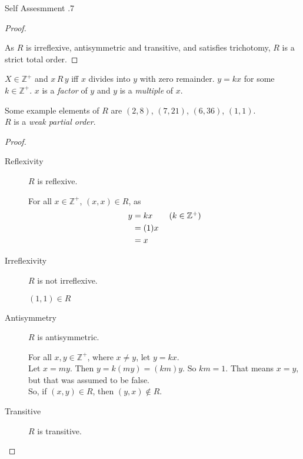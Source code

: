 \documentclass[\main/notes.tex]{subfiles}
\begin{document}
\begin{exercise}{Self Assesmment \thechapter.7}
\begin{questions}
\begin{answer}
\begin{proof}
\begin{description}
\begin{subproof}
											\end{subproof}
									\end{description}
									As $R$ is irreflexive, antisymmetric and transitive, and satisfies trichotomy, $R$ is a strict total order.
								\end{proof}
							\end{answer}
						\pagebreak
						\item $X \in \mathbb{Z}^{+}$ and $x \, R \, y$ iff $x$ divides into $y$ with zero remainder. $y = kx$ for some $k \in \mathbb{Z}^{+}$. $x$ is a \emph{factor} of $y$ and $y$ is a \emph{multiple} of $x$.\\
							\begin{answer}
								Some example elements of $R$ are $(2, 8)$, $(7, 21)$, $(6, 36)$, $(1, 1)$.\\
								$R$ is a \emph{weak partial order}.
								\begin{proof}
									$ $
									\begin{description}
										\item[Reflexivity] $R$ is reflexive.
											\begin{subproof}
												For all $x \in \mathbb{Z}^{+}$, $(x, x) \in R$, as
												\begin{align*}
													y &= kx \tag*{$(k \in \mathbb{Z}^{+})$}\\
													&= (1)x\\
													&= x
												\end{align*}
											\end{subproof}
										\item[Irreflexivity] $R$ is not irreflexive.
											\begin{subproof}[Counterexample]
												$(1, 1) \in R$
											\end{subproof}
										\item[Antisymmetry] $R$ is antisymmetric.
											\begin{subproof}
												For all $x, y \in \mathbb{Z}^{+}$, where $x \neq y$, let $y = kx$.\\
												Let $x = my$. Then $y = k(my) = (km)y$. So $km = 1$. That means $x = y$, but that was assumed to be false.\\
												So, if $(x, y) \in R$, then $(y, x) \notin R$.
											\end{subproof}
										\item[Transitive] $R$ is transitive.
											\begin{subproof}

\end{subproof}
\end{description}
\end{proof}
\end{answer}
\end{questions}
\end{exercise}
\end{document}
